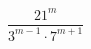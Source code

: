 \begin{ex}[type=expression]
	\begin{condition}
		\( \dfrac{21^m}{3^{m-1}\cdot7^{m+1}} \)
	\end{condition}
\end{ex}